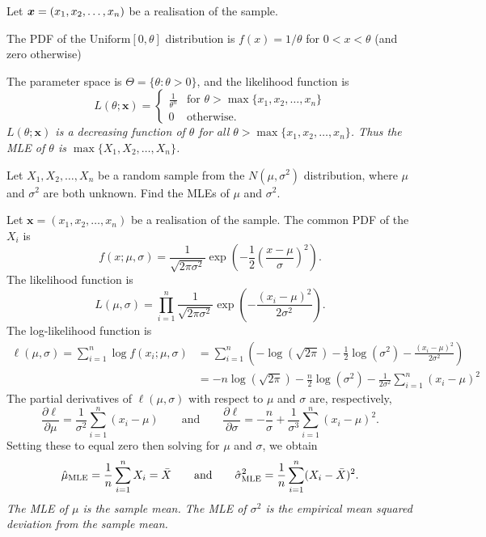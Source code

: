 \begin{solution}
Let $\boldsymbol{x} = (x_1,x_2,\ldots,x_n)$ be a realisation of the sample.

\bigskip
The PDF of the $\text{Uniform}[0,\theta]$ distribution is $f(x) = 1/\theta$ for $0 < x < \theta$ (and zero otherwise)

\bigskip
The parameter space is $\Theta = \{\theta:\theta>0\}$, and the likelihood function is
\[
L(\theta;\mathbf{x}) = \left\{\begin{array}{ll}
	\displaystyle\frac{1}{\theta^n}	& \text{for } \theta > \max\{x_1,x_2,\ldots,x_n\} \\[2ex]
	0				& \text{otherwise}.
\end{array}\right.
\]
\bit
\it $L(\theta;\mathbf{x})$ is a decreasing function of $\theta$ for all $\theta>\max\{x_1,x_2,\ldots,x_n\}$.
\it Thus the MLE of $\theta$ is $\max\{X_1,X_2,\ldots,X_n\}$.
\eit
\end{solution}

\begin{example}
Let $X_1,X_2,\ldots,X_n$ be a random sample from the $N(\mu,\sigma^2)$ distribution, where $\mu$ and $\sigma^2$ are both unknown. Find the MLEs of $\mu$ and $\sigma^2$.
\begin{solution}
Let $\mathbf{x} = (x_1,x_2,\ldots,x_n)$ be a realisation of the sample. The common PDF of the $X_i$ is
\[
f(x;\mu,\sigma) = \frac{1}{\sqrt{2\pi\sigma^2}}\exp\left(-\frac{1}{2}\left(\frac{x-\mu}{\sigma}\right)^2\right).
\]
The likelihood function is 
\[
L(\mu,\sigma) = \prod_{i=1}^n \frac{1}{\sqrt{2\pi\sigma^2}}\exp\left(-\frac{(x_i-\mu)^2}{2\sigma^2}\right).
\]
The log-likelihood function is
\begin{align*}
\ell(\mu,\sigma) 
	= \sum_{i=1}^n \log f(x_i;\mu,\sigma) 
	& = \sum_{i=1}^n \left( -\log(\sqrt{2\pi}) - \frac{1}{2}\log(\sigma^2) - \frac{(x_i-\mu)^2}{2\sigma^2}\right) \\
	& = -n\log(\sqrt{2\pi}) - \frac{n}{2}\log(\sigma^2) - \frac{1}{2\sigma^2}\sum_{i=1}^n (x_i-\mu)^2
\end{align*}
The partial derivatives of $\ell(\mu,\sigma)$ with respect to $\mu$ and $\sigma$ are, respectively,
\[
\frac{\partial\ell}{\partial\mu} = \frac{1}{\sigma^2}\sum_{i=1}^n(x_i-\mu)
\qquad\text{and}\qquad
\frac{\partial\ell}{\partial\sigma} = -\frac{n}{\sigma} + \frac{1}{\sigma^3}\sum_{i=1}^n(x_i-\mu)^2.
\]
Setting these to equal zero then solving for $\mu$ and $\sigma$, we obtain
\[
\hat{\mu}_{\text{\scriptsize{MLE}}} = \frac{1}{n}\sum_{i=1}^n X_i = \bar{X}
\qquad\text{and}\qquad
\hat{\sigma}^2_{\text{\scriptsize{MLE}}} = \frac{1}{n}\sum_{i=1}^n (X_i-\bar{X})^2.
\]
\bit
\it The MLE of $\mu$ is the \emph{sample mean}.
\it The MLE of $\sigma^2$ is the \emph{empirical mean squared deviation from the sample mean}.
\eit
\end{solution}
\end{example}

